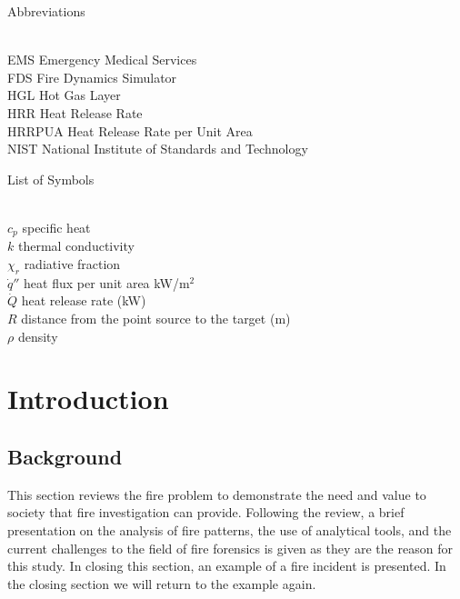\documentclass[twoside]{uocthesis}
\begin{document}
\clearpage
Abbreviations
\begin{tabbing}
\hspace{1.5in} \= \\
EMS \> Emergency Medical Services \\
FDS \> Fire Dynamics Simulator \\
HGL \> Hot Gas Layer \\
HRR \> Heat Release Rate \\
HRRPUA \> Heat Release Rate per Unit Area \\
NIST \> National Institute of Standards and Technology \\
\end{tabbing}

List of Symbols
\begin{tabbing}
\hspace{1.5in} \= \\
$c_{p}$ \> specific heat \\
$k$ \> thermal conductivity \\
$\chi_r$ \> radiative fraction \\
$\dot{q}''$ \> heat flux per unit area kW/m$^2$ \\
$\dot{Q}$ \> heat release rate (kW) \\ 
$R$ \> distance from the point source to the target (m) \\
$\rho$ \> density \\
\end{tabbing}

\textpages

\chapter{Introduction}
\label{chapter:Introduction}
\section{Background}

This section reviews the fire problem to demonstrate the need and value to society that fire investigation can provide. Following the review, a brief presentation on the analysis  of fire patterns, the use of analytical tools, and the current challenges to the field of fire forensics is given as they are the reason for this study.  In closing this section, an example of a fire incident is presented. In the closing section we will return to the example again.   
\end{document}
